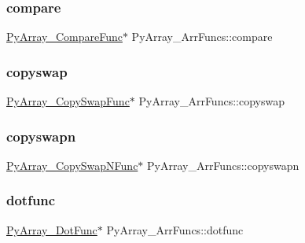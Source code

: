 \subsubsection{\texorpdfstring{compare}{compare}}
{\footnotesize\ttfamily \hyperlink{ndarraytypes_8h_a1bb6eebdea5a5b4eaae721ef26cbd20f}{Py\+Array\+\_\+\+Compare\+Func}$\ast$ Py\+Array\+\_\+\+Arr\+Funcs\+::compare}

\mbox{\label{structPyArray__ArrFuncs_a3bf4ac698a5aa0a1589c48fce99dde75}} 
\subsubsection{\texorpdfstring{copyswap}{copyswap}}
{\footnotesize\ttfamily \hyperlink{ndarraytypes_8h_a0dcacef2e2efd85ee55a1516a7e26ba1}{Py\+Array\+\_\+\+Copy\+Swap\+Func}$\ast$ Py\+Array\+\_\+\+Arr\+Funcs\+::copyswap}

\mbox{\label{structPyArray__ArrFuncs_a8a872a121cc3cef06c47db655a15f61a}} 
\subsubsection{\texorpdfstring{copyswapn}{copyswapn}}
{\footnotesize\ttfamily \hyperlink{ndarraytypes_8h_aeab97280f4d0ef137ff4bdb187134481}{Py\+Array\+\_\+\+Copy\+Swap\+N\+Func}$\ast$ Py\+Array\+\_\+\+Arr\+Funcs\+::copyswapn}

\mbox{\label{structPyArray__ArrFuncs_a2763541bd95eae9146709afdfb1f3d88}} 
\subsubsection{\texorpdfstring{dotfunc}{dotfunc}}
{\footnotesize\ttfamily \hyperlink{ndarraytypes_8h_af837312e9d8e350d60415957236e3026}{Py\+Array\+\_\+\+Dot\+Func}$\ast$ Py\+Array\+\_\+\+Arr\+Funcs\+::dotfunc}

